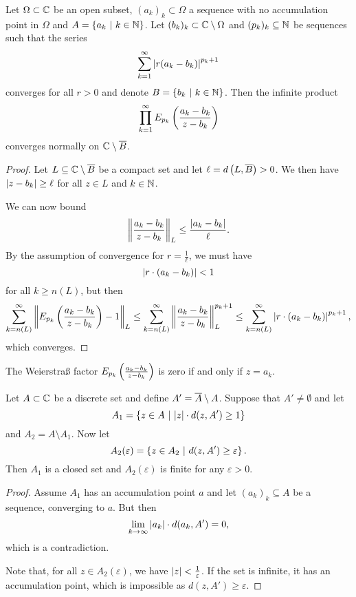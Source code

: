 \obvs

\begin{lema}
\label{inf_prod:lm:w_prod_omega}
Let $\Omega \subset \mathbb{C}$ be an open subset, $(a_k)_k \subset \Omega$
a sequence with no accumulation point in $\Omega$ and
$A = \left\{a_k~\middle\vert~k \in \mathbb{N}\right\}$. Let
$(b_k)_k \subset \mathbb{C} \setminus \Omega$ and $(p_k)_k \subseteq \mathbb{N}$ be
sequences such that the series
\[
\sum_{k=1}^\infty \left\lvert r (a_k - b_k)\right\rvert^{p_k+1}
\]
converges for all $r > 0$ and denote $B = \left\{b_k~\middle\vert~k \in \mathbb{N}\right\}$.
Then the infinite product
\[
\prod_{k=1}^\infty E_{p_k} \left(\frac{a_k - b_k}{z - b_k}\right)
\]
converges normally on $\mathbb{C} \setminus \overline{B}$.
\end{lema}

\begin{proof}
Let $L \subseteq \mathbb{C} \setminus \overline{B}$ be a compact set and let
$\ell = d\left(L, \overline{B}\right) > 0$. We then have
$\left\lvert z - b_k\right\rvert \geq \ell$ for all $z \in L$ and $k \in \mathbb{N}$.

We can now bound
\[
\left\lVert \frac{a_k - b_k}{z - b_k}\right\rVert_L \leq
\frac{\left\lvert a_k - b_k\right\rvert}{\ell}.
\]
By the assumption of convergence for $r = \frac{1}{\ell}$, we must
have
\[
\left\lvert r \cdot (a_k - b_k)\right\rvert < 1
\]
for all $k \geq n(L)$, but then
\[
\sum_{k=n(L)}^\infty
\left\lVert E_{p_k} \left(\frac{a_k - b_k}{z - b_k}\right) - 1\right\rVert_L \leq
\sum_{k=n(L)}^\infty 
\left\lVert \frac{a_k - b_k}{z - b_k}\right\rVert_L^{p_k+1}\leq
\sum_{k=n(L)}^\infty \left\lvert r \cdot \left(a_k - b_k\right)\right\rvert^{p_k+1},
\]
which converges.
\end{proof}

\begin{opomba}
The Weierstraß factor $E_{p_k} \left(\frac{a_k - b_k}{z - b_k}\right)$ is
zero if and only if $z = a_k$.
\end{opomba}

\begin{lema}
\label{inf_prod:lm:divideA}
Let $A \subset \mathbb{C}$ be a discrete set and define
$A' = \overline{A} \setminus A$. Suppose that $A' \ne \emptyset$ and
let
\[
A_1 = \left\{z \in A~\middle\vert~\left\lvert z\right\rvert \cdot d(z, A') \geq 1\right\}
\]
and $A_2 = A \setminus A_1$. Now let
\[
A_2(\varepsilon) = \left\{z \in A_2~\middle\vert~d(z, A') \geq \varepsilon\right\}.
\]
Then $A_1$ is a closed set and $A_2(\varepsilon)$ is finite for any
$\varepsilon > 0$.
\end{lema}

\begin{proof}
Assume $A_1$ has an accumulation point $a$ and let
$(a_k)_k \subseteq A$ be a sequence, converging to $a$. But then
\[
\lim_{k \to \infty} \left\lvert a_k\right\rvert \cdot d(a_k, A') = 0,
\]
which is a contradiction.

Note that, for all $z \in A_2(\varepsilon)$, we have
$\left\lvert z\right\rvert < \frac{1}{\varepsilon}$. If the set is infinite, it has
an accumulation point, which is impossible as
$d(z, A') \geq \varepsilon$.
\end{proof}

